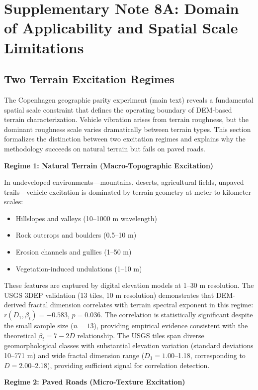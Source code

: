 \documentclass[11pt,letterpaper]{article}
\begin{document}
\section{Supplementary Note 8A: Domain of Applicability and Spatial Scale Limitations}

\subsection{Two Terrain Excitation Regimes}

The Copenhagen geographic parity experiment (main text) reveals a fundamental spatial scale constraint that defines the operating boundary of DEM-based terrain characterization. Vehicle vibration arises from terrain roughness, but the dominant roughness scale varies dramatically between terrain types. This section formalizes the distinction between two excitation regimes and explains why the methodology succeeds on natural terrain but fails on paved roads.

\textbf{Regime 1: Natural Terrain (Macro-Topographic Excitation)}

In undeveloped environments---mountains, deserts, agricultural fields, unpaved trails---vehicle excitation is dominated by terrain geometry at meter-to-kilometer scales:
\begin{itemize}
\item Hillslopes and valleys (10--1000 m wavelength)
\item Rock outcrops and boulders (0.5--10 m)
\item Erosion channels and gullies (1--50 m)
\item Vegetation-induced undulations (1--10 m)
\end{itemize}

These features are captured by digital elevation models at 1--30 m resolution. The USGS 3DEP validation (13 tiles, 10 m resolution) demonstrates that DEM-derived fractal dimension correlates with terrain spectral exponent in this regime: $r(D_1, \beta_t) = -0.583$, $p = 0.036$. The correlation is statistically significant despite the small sample size ($n=13$), providing empirical evidence consistent with the theoretical $\beta_t = 7-2D$ relationship. The USGS tiles span diverse geomorphological classes with substantial elevation variation (standard deviations 10--771 m) and wide fractal dimension range ($D_1 = 1.00$--1.18, corresponding to $D = 2.00$--2.18), providing sufficient signal for correlation detection.

\textbf{Regime 2: Paved Roads (Micro-Texture Excitation)}
\end{document}
